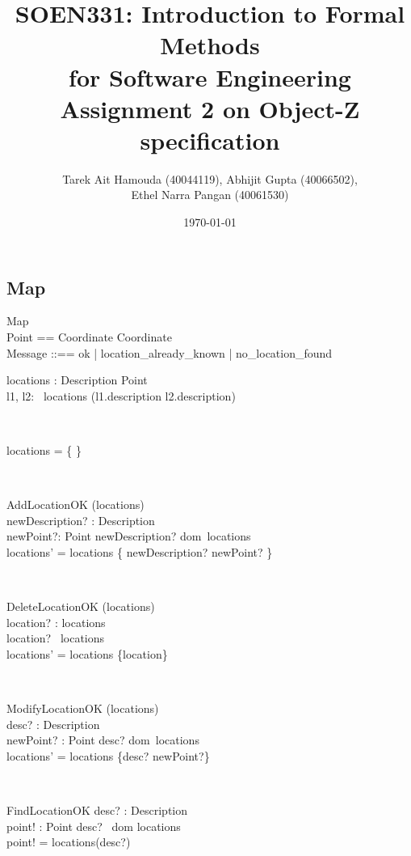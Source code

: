 \documentclass[12pt]{article}
\title{SOEN331: Introduction to Formal Methods\\for Software Engineering\\
Assignment 2 on Object-Z specification}
\author{Tarek Ait Hamouda (40044119), Abhijit Gupta (40066502),\\ 
Ethel Narra Pangan (40061530)}
\date{\today}
\begin{document}
\begin{spacing}{1.5}

\maketitle

\newpage

\section{Map}

\begin{class}{Map}
 \\
Point == Coordinate \times Coordinate \\
Message ::== ok | location\_already\_known | no\_location\_found \\
\begin{state}
locations : Description \pfun Point\\
\where
\forall l1, l2: ~locations \bullet (l1.description \neq l2.description)
\end{state} \\
\begin{init}
locations = \{ \}
\end{init} \\
\begin{op}{AddLocationOK}
\Delta (locations) \\
newDescription? : Description\\
newPoint?: Point 
\ST
newDescription? \notin dom~locations \\
locations' = locations \cup \{ newDescription? \to newPoint? \}
\end{op}\\
\begin{op}{DeleteLocationOK}
\Delta (locations) \\
location? : locations\\
\ST
location? \in ~locations\\
locations' = locations \setminus \{location\}
\end{op}\\
\begin{op}{ModifyLocationOK}
\Delta (locations) \\
desc? : Description\\
newPoint? : Point
\ST
desc? \in dom~locations \\
locations' = locations \oplus \{desc? \to newPoint?\}
\end{op}\\ 
\begin{op}{FindLocationOK}
desc? : Description\\
point! : Point
\ST
desc? \in ~dom locations \\
point! = locations(desc?)
\end{op}\\


\end{class}
\end{spacing}
\end{document}
